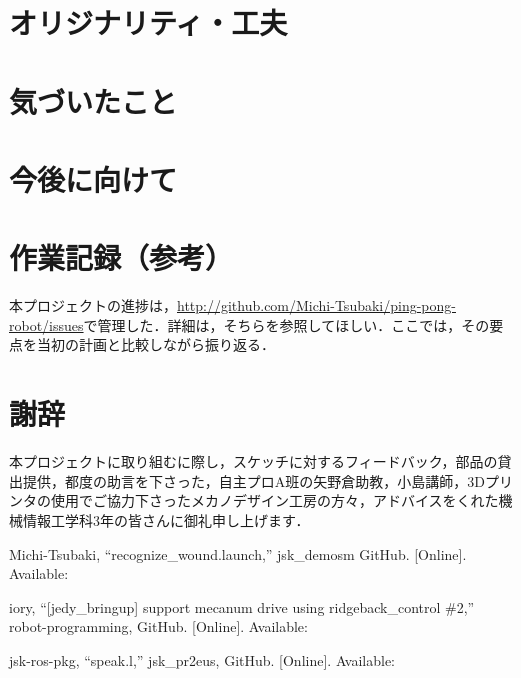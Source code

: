 \documentclass[11pt, oneside, titlepage]{jarticle}
\begin{document}
\section{オリジナリティ・工夫}

\section{気づいたこと}

\section{今後に向けて}

\section{作業記録（参考）}
本プロジェクトの進捗は，\url{http://github.com/Michi-Tsubaki/ping-pong-robot/issues}で管理した．詳細は，そちらを参照してほしい．ここでは，その要点を当初の計画と比較しながら振り返る．
\section{謝辞}
本プロジェクトに取り組むに際し，スケッチに対するフィードバック，部品の貸出提供，都度の助言を下さった，自主プロA班の矢野倉助教，小島講師，3Dプリンタの使用でご協力下さったメカノデザイン工房の方々，アドバイスをくれた機械情報工学科3年の皆さんに御礼申し上げます．

\begin{thebibliography}{9}
Michi-Tsubaki, ``recognize\_wound.launch,'' jsk\_demosm GitHub. [Online]. Available: 

iory, ``[jedy\_bringup] support mecanum drive using ridgeback\_control \#2,'' robot-programming, GitHub. [Online]. Available: 

jsk-ros-pkg, ``speak.l,'' jsk\_pr2eus, GitHub. [Online]. Available: 
\end{thebibliography}
\end{document}
